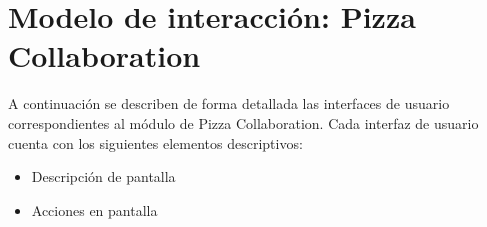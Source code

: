
\chapter{Modelo de interacción: Pizza Collaboration}

	A continuación se describen de forma detallada las interfaces de usuario correspondientes al módulo de Pizza Collaboration. Cada interfaz de usuario cuenta con los siguientes elementos descriptivos:

	\begin{itemize}

		\item Descripción de pantalla

		\item Acciones en pantalla

	\end{itemize}

	

